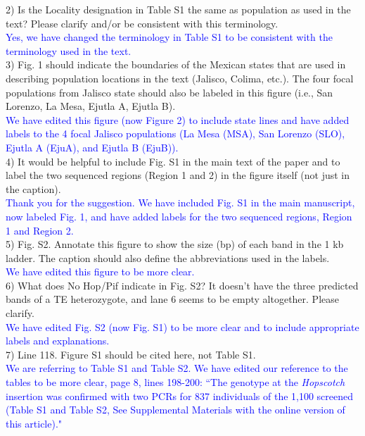 \documentclass[11pt]{article}
\newcommand{\res}[1]{\noindent \textcolor{blue}{{#1}} \\}
\begin{document}
2) Is the Locality designation in Table S1 the same as population as used in the text? Please clarify and/or be consistent with this terminology.\\

\res{Yes, we have changed the terminology in Table S1 to be consistent with the terminology used in the text.}

3) Fig. 1 should indicate the boundaries of the Mexican states that are used in describing population locations in the text (Jalisco, Colima, etc.). The four focal populations from Jalisco state should also be labeled in this figure (i.e., San Lorenzo, La Mesa, Ejutla A, Ejutla B).\\

\res{We have edited this figure (now Figure 2) to include state lines and have added labels to the 4 focal Jalisco populations (La Mesa (MSA), San Lorenzo (SLO), Ejutla A (EjuA), and Ejutla B (EjuB)).}

4) It would be helpful to include Fig. S1 in the main text of the paper and to label the two sequenced regions (Region 1 and 2) in the figure itself (not just in the caption). \\

\res{Thank you for the suggestion. We have included Fig. S1 in the main manuscript, now labeled Fig. 1, and have added labels for the two sequenced regions, Region 1 and Region 2.}

5) Fig. S2. Annotate this figure to show the size (bp) of each band in the 1 kb ladder. The caption should also define the abbreviations used in the labels. \\

\res{We have edited this figure to be more clear.}

6) What does No Hop/Pif indicate in Fig. S2? It doesn't have the three predicted bands of a TE heterozygote, and lane 6 seems to be empty altogether. Please clarify. \\

\res{We have edited Fig. S2 (now Fig. S1) to be more clear and to include appropriate labels and explanations.}

7) Line 118. Figure S1 should be cited here, not Table S1. \\

\res{We are referring to Table S1 and Table S2. We have edited our reference to the tables to be more clear, page 8, lines 198-200: ``The genotype at the \emph{Hopscotch} insertion was confirmed with two PCRs for 837 individuals of the 1,100 screened (Table S1 and Table S2, See Supplemental Materials with the online version of this article)."}
\end{document}
